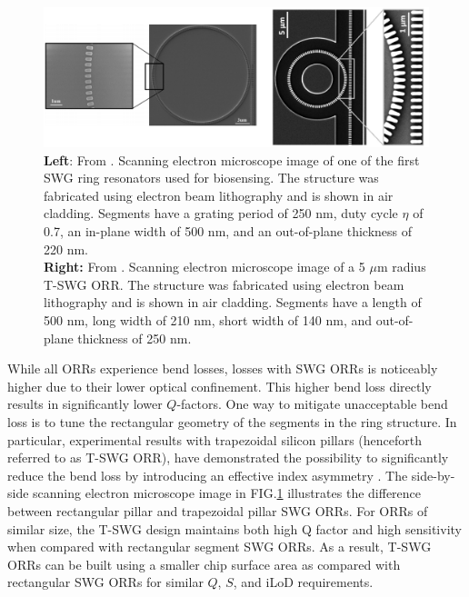 \documentclass[aps,prl,twocolumn, superscriptaddress,nobalancelastpage]{revtex4}
\begin{document}
\pagebreak
\onecolumngrid

 \begin{figure}[!ht]
    \centering
    \includegraphics[width=15cm]{SWGSEM.png}
    \caption{\textbf{Left}: From \cite{swg3}. Scanning electron microscope image of one of the first SWG ring resonators used for biosensing. The structure was fabricated using electron beam lithography and is shown in air cladding. Segments have a grating period of 250 nm, duty cycle $\eta$ of 0.7,  an in-plane width of 500 nm, and an out-of-plane thickness of 220 nm.  \\ 
    \textbf{Right:} From  \cite{trapezoidal}. Scanning electron microscope image of a 5 $\mu$m radius T-SWG ORR. The structure was fabricated using electron beam lithography and is shown in air cladding. Segments have a length of 500 nm, long width of 210 nm, short width of 140 nm, and out-of-plane thickness of 250 nm.}
    \label{fig:swgSEM}
\end{figure}

\twocolumngrid

While all ORRs experience bend losses, losses with SWG ORRs is noticeably higher due to their lower optical confinement. This higher bend loss directly results in significantly lower $Q$-factors. One way to mitigate unacceptable bend loss is to tune the rectangular geometry of the segments in the ring structure. In particular, experimental results with trapezoidal silicon pillars (henceforth referred to as T-SWG ORR), have demonstrated the possibility to significantly reduce the bend loss by introducing an effective index asymmetry \cite{trapezoidal}. The side-by-side scanning electron microscope image in FIG.\ref{fig:swgSEM} illustrates the difference between rectangular pillar and trapezoidal pillar SWG ORRs. For ORRs of similar size, the T-SWG design maintains both high Q factor and high sensitivity when compared with rectangular segment SWG ORRs. As a result, T-SWG ORRs can be built using a smaller chip surface area as compared with rectangular SWG ORRs for similar $Q$, $S$, and iLoD requirements. 
\end{document}
